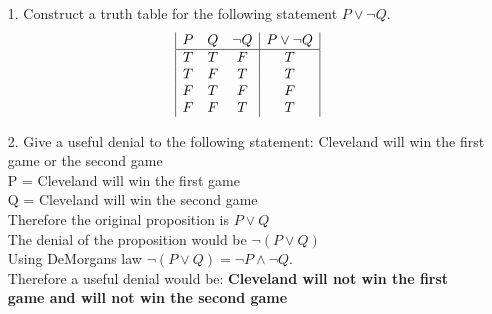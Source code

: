 \documentclass[a4paper,12pt]{article}
\begin{document}
    \begin{itemize}
      \item[1.] Construct a truth table for the following statement $P \lor \neg Q$.
      \begin{displaymath}
        \begin{array}{|c c c|c|}
        P & Q & \neg Q & P \lor \neg Q\\
        \hline
        T & T & F & T\\
        T & F & T & T\\
        F & T & F & F\\
        F & F & T & T\\
        \end{array}
      \end{displaymath} 
      \item[2.] Give a useful denial to the following statement: Cleveland will win the first game or the second game
      \\
      P = Cleveland will win the first game
      \\
      Q = Cleveland will win the second game 
      \\
      Therefore the original proposition is $P \lor Q$\\
      The denial of the proposition would be $\neg(P \lor Q)$\\
      Using DeMorgans law $\neg(P \lor Q) = \neg P \land \neg Q$.\\
      Therefore a useful denial would be: \bf{Cleveland will not win the first game and will not win the second game}
    \end{itemize} 
\end{document}
